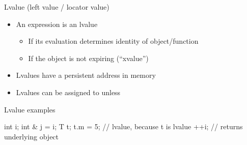\begin{frame}[fragile]
  \begin{block}{Lvalue (left value / locator value)}
    \begin{itemize}
      \item An expression is an lvalue
      \begin{itemize}
        \item If its evaluation determines identity of object/function
        \item If the object is not expiring (``xvalue'')
      \end{itemize}
      \item Lvalues have a persistent address in memory
      \item Lvalues can be assigned to unless 
    \end{itemize}
  \end{block}
  \begin{exampleblock}{Lvalue examples}
    \begin{cppcode*}{}
      int i;
      int & j = i;
      T t;
      t.m = 5; // lvalue, because t is lvalue
      ++i;     // returns underlying object
    \end{cppcode*}
  \end{exampleblock}
\end{frame}

